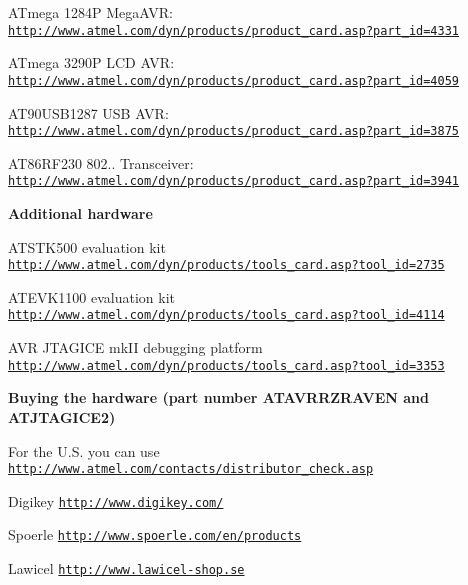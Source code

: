  \begin{DoxyItemize}
\item \-A\-Tmega 1284\-P \-Mega\-A\-V\-R\-: \href{http://www.atmel.com/dyn/products/product_card.asp?part_id=4331}{\tt http\-://www.\-atmel.\-com/dyn/products/product\-\_\-card.\-asp?part\-\_\-id=4331} \item \-A\-Tmega 3290\-P \-L\-C\-D \-A\-V\-R\-: \href{http://www.atmel.com/dyn/products/product_card.asp?part_id=4059}{\tt http\-://www.\-atmel.\-com/dyn/products/product\-\_\-card.\-asp?part\-\_\-id=4059} \item \-A\-T90\-U\-S\-B1287 \-U\-S\-B \-A\-V\-R\-: \href{http://www.atmel.com/dyn/products/product_card.asp?part_id=3875}{\tt http\-://www.\-atmel.\-com/dyn/products/product\-\_\-card.\-asp?part\-\_\-id=3875} \item \-A\-T86\-R\-F230 802.. \-Transceiver\-: \href{http://www.atmel.com/dyn/products/product_card.asp?part_id=3941}{\tt http\-://www.\-atmel.\-com/dyn/products/product\-\_\-card.\-asp?part\-\_\-id=3941}\end{DoxyItemize}
{\bfseries \-Additional hardware}\par
 \begin{DoxyItemize}
\item \-A\-T\-S\-T\-K500 evaluation kit \href{http://www.atmel.com/dyn/products/tools_card.asp?tool_id=2735}{\tt http\-://www.\-atmel.\-com/dyn/products/tools\-\_\-card.\-asp?tool\-\_\-id=2735} \item \-A\-T\-E\-V\-K1100 evaluation kit \href{http://www.atmel.com/dyn/products/tools_card.asp?tool_id=4114}{\tt http\-://www.\-atmel.\-com/dyn/products/tools\-\_\-card.\-asp?tool\-\_\-id=4114} \item \-A\-V\-R \-J\-T\-A\-G\-I\-C\-E mk\-I\-I debugging platform \href{http://www.atmel.com/dyn/products/tools_card.asp?tool_id=3353}{\tt http\-://www.\-atmel.\-com/dyn/products/tools\-\_\-card.\-asp?tool\-\_\-id=3353}\end{DoxyItemize}
{\bfseries \-Buying the hardware (part number \-A\-T\-A\-V\-R\-R\-Z\-R\-A\-V\-E\-N and \-A\-T\-J\-T\-A\-G\-I\-C\-E2)}\par
 \begin{DoxyItemize}
\item \-For the \-U.\-S. you can use \href{http://www.atmel.com/contacts/distributor_check.asp}{\tt http\-://www.\-atmel.\-com/contacts/distributor\-\_\-check.\-asp} \item \-Digikey \href{http://www.digikey.com/}{\tt http\-://www.\-digikey.\-com/} \item \-Spoerle \href{http://www.spoerle.com/en/products}{\tt http\-://www.\-spoerle.\-com/en/products} \item \-Lawicel \href{http://www.lawicel-shop.se}{\tt http\-://www.\-lawicel-\/shop.\-se}\end{DoxyItemize}
